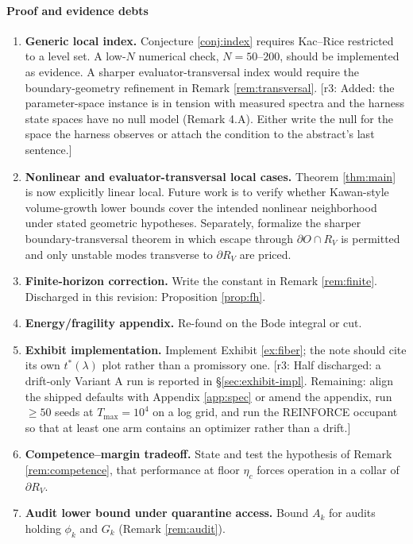 \documentclass[11pt]{article}
\theoremstyle{definition}
\theoremstyle{remark}
\newcommand{\RV}{R_V}
\newcommand{\revnote}[1]{\textcolor{red!60!black}{[r3: #1]}}
\begin{document}
\paragraph{Proof and evidence debts}
\begin{enumerate}
\item \textbf{Generic local index.} Conjecture \ref{conj:index} requires Kac--Rice restricted to a level set. A low-$N$ numerical check, $N=50$--$200$, should be implemented as evidence. A sharper evaluator-transversal index would require the boundary-geometry refinement in Remark \ref{rem:transversal}. \revnote{Added: the parameter-space instance is in tension with measured spectra and the harness state spaces have no null model (Remark 4.A). Either write the null for the space the harness observes or attach the condition to the abstract's last sentence.}
\item \textbf{Nonlinear and evaluator-transversal local cases.} Theorem \ref{thm:main} is now explicitly linear local. Future work is to verify whether Kawan-style volume-growth lower bounds \cite{kawan2013,kawan2011} cover the intended nonlinear neighborhood under stated geometric hypotheses. Separately, formalize the sharper boundary-transversal theorem in which escape through $\partial O\cap\RV$ is permitted and only unstable modes transverse to $\partial\RV$ are priced.
\item \textbf{Finite-horizon correction.} Write the constant in Remark \ref{rem:finite}. Discharged in this revision: Proposition \ref{prop:fh}.
\item \textbf{Energy/fragility appendix.} Re-found on the Bode integral or cut.
\item \textbf{Exhibit implementation.} Implement Exhibit \ref{ex:fiber}; the note should cite its own $t^*(\lambda)$ plot rather than a promissory one. \revnote{Half discharged: a drift-only Variant A run is reported in \S\ref{sec:exhibit-impl}. Remaining: align the shipped defaults with Appendix \ref{app:spec} or amend the appendix, run $\ge50$ seeds at $T_{\max}=10^4$ on a log grid, and run the REINFORCE occupant so that at least one arm contains an optimizer rather than a drift.}
\item \textbf{Competence--margin tradeoff.} State and test the hypothesis of Remark \ref{rem:competence}, that performance at floor $\eta_c$ forces operation in a collar of $\partial\RV$.
\item \textbf{Audit lower bound under quarantine access.} Bound $A_k$ for audits holding $\phi_k$ and $G_k$ (Remark \ref{rem:audit}).

\end{enumerate}
\end{document}
